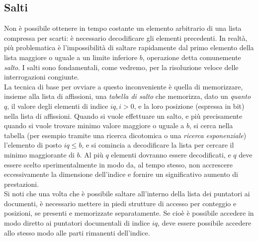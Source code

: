 \subsection{Salti}
Non è possibile ottenere in tempo costante un elemento arbitrario di una lista compressa per scarti: è necessario decodificare gli elementi precedenti. In realtà, più problematica è l'impossibilità di saltare rapidamente dal primo elemento della lista maggiore o uguale a un limite inferiore $b$, operazione detta comunemente \textit{salto}. I salti sono fondamentali, come vedremo, per la risoluzione veloce delle interrogazioni congiunte.\\
La tecnica di base per ovviare a questo inconveniente è quella di memorizzare, insieme alla lista di affissioni, una \textit{tabella di salto} che memorizza, dato un \textit{quanto} $q$, il valore degli elementi di indice $iq, i > 0$, e la loro posizione (espressa in bit) nella lista di affissioni. Quando si vuole effettuare un salto, e più precisamente quando si vuole trovare minimo valore maggiore o uguale a $b$, si cerca nella tabella (per esempio tramite una ricerca dicotomica o una \textit{ricerca esponenziale}) l'elemento di posto $iq \leq b$, e si comincia a decodificare la lista per cercare il minimo maggiorante di $b$. Al più $q$ elementi dovranno essere decodificati, e $q$ deve essere scelto sperimentalmente in modo da, al tempo stesso, non accrescere eccessivamente la dimensione dell'indice e fornire un significativo aumento di prestazioni.\\
Si noti che una volta che è possibile saltare all'interno della lista dei puntatori ai documenti, è necessario mettere in piedi strutture di accesso per conteggio e posizioni, se presenti e memorizzate separatamente. Se cioè è possibile accedere in modo diretto ai puntatori documentali di indice $iq$, deve essere possibile accedere allo stesso modo alle parti rimanenti dell'indice.
